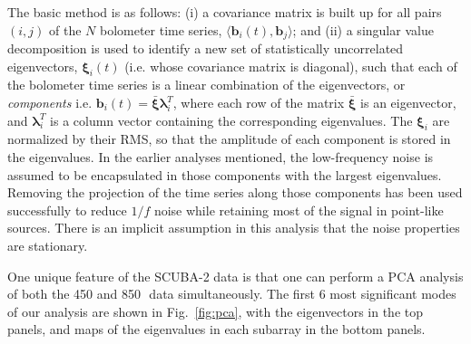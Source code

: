 \documentclass[useAMS,usenatbib,nofootinbib]{mn2e}
\newcommand{\rms}{RMS}
\begin{document}
The basic method is as follows: (i) a covariance matrix is built up
for all pairs $(i,j)$ of the $N$ bolometer time series,
$\langle\mathbf{b}_i(t),\mathbf{b}_j\rangle$; and (ii) a singular
value decomposition is used to identify a new set of statistically
uncorrelated eigenvectors, $\mathbf{\xi}_i(t)$ (i.e. whose covariance
matrix is diagonal), such that each of the bolometer time series is a
linear combination of the eigenvectors, or \emph{components}
i.e. $\mathbf{b}_i(t) = \bar{\mathbf{\xi}} \mathbf{\lambda}_i^T$,
where each row of the matrix $\bar{\mathbf{\xi}}$ is an eigenvector,
and $\mathbf{\lambda}_i^T$ is a column vector containing the
corresponding eigenvalues. The $\mathbf{\xi}_i$ are normalized by
their \rms, so that the amplitude of each component is stored in the
eigenvalues. In the earlier analyses mentioned, the low-frequency
noise is assumed to be encapsulated in those components with the
largest eigenvalues. Removing the projection of the time series along
those components has been used successfully to reduce $1/f$ noise
while retaining most of the signal in point-like sources. There is an
implicit assumption in this analysis that the noise properties are
stationary.

One unique feature of the SCUBA-2 data is that one can perform a PCA
analysis of both the 450 and 850\,\micron\ data simultaneously. The
first 6 most significant modes of our analysis are shown in
Fig.~\ref{fig:pca}, with the eigenvectors in the top panels, and maps
of the eigenvalues in each subarray in the bottom panels.
\end{document}
